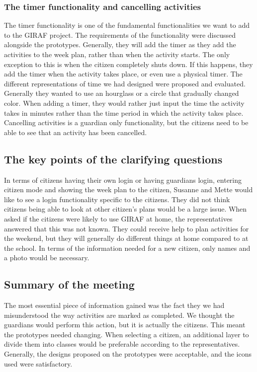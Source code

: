 \subsubsection{The timer functionality and cancelling activities}
The timer functionality is one of the fundamental functionalities we want to add to the GIRAF project.
The requirements of the functionality were discussed alongside the prototypes.
Generally, they will add the timer as they add the activities to the week plan, rather than when the activity starts. 
The only exception to this is when the citizen completely shuts down. 
If this happens, they add the timer when the activity takes place, or even use a physical timer.
The different representations of time we had designed were proposed and evaluated.
Generally they wanted to use an hourglass or a circle that gradually changed color.
When adding a timer, they would rather just input the time the activity takes in minutes rather than the time period in which the activity takes place.
Cancelling activities is a guardian only functionality, but the citizens need to be able to see that an activity has been cancelled. 

\subsection{The key points of the clarifying questions}
In terms of citizens having their own login or having guardians login, entering citizen mode and showing the week plan to the citizen, Susanne and Mette would like to see a login functionality specific to the citizens.
They did not think citizens being able to look at other citizen's plans would be a large issue.
When asked if the citizens were likely to use GIRAF at home, the representatives answered that this was not known.
They could receive help to plan activities for the weekend, but they will generally do different things at home compared to at the school. 
In terms of the information needed for a new citizen, only names and a photo would be necessary. 

\subsection{Summary of the meeting}
The most essential piece of information gained was the fact they we had misunderstood the way activities are marked as completed. 
We thought the guardians would perform this action, but it is actually the citizens. 
This meant the prototypes needed changing.
When selecting a citizen, an additional layer to divide them into classes would be preferable according to the representatives.
Generally, the designs proposed on the prototypes were acceptable, and the icons used were satisfactory.